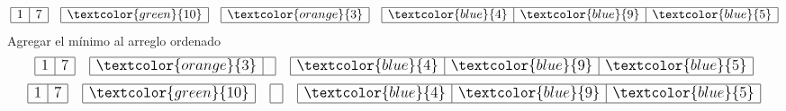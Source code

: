 \documentclass{article}
\begin{document}
\begin{minipage}{0.5\textwidth}
\begin{equation*}
\begin{array}{|r|r|}
      \hline 1 & 7\\ \hline
    \end{array} \quad
    \begin{array}{|r|}
      \hline \textcolor{green}{10} \\ \hline
    \end{array} \quad
    \begin{array}{|r|}
      \hline \textcolor{orange}{3} \\ \hline
    \end{array} \quad 
    \begin{array}{|r|r|r|}
      \hline \textcolor{blue}{4} & \textcolor{blue}{9} & \textcolor{blue}{5} \\ \hline
    \end{array}
  \end{equation*}
  Agregar el mínimo al arreglo ordenado
  \begin{equation*}
    \large
    \begin{array}{|r|r|}
      \hline 1 & 7\\ \hline
    \end{array} \quad
    \begin{array}{|r|r|}
      \hline \textcolor{orange}{3} & \\ \hline
    \end{array}\quad 
    \begin{array}{|r|r|r|}
      \hline \textcolor{blue}{4} & \textcolor{blue}{9} & \textcolor{blue}{5} \\ \hline
    \end{array}
  \end{equation*}
  \begin{equation*}
    \large
    \begin{array}{|r|r|}
      \hline 1 & 7\\ \hline
    \end{array} \quad
    \begin{array}{|r|}
      \hline \textcolor{green}{10} \\ \hline
    \end{array} \quad
    \begin{array}{|r|}
      \hline \\ \hline
    \end{array} \quad 
    \begin{array}{|r|r|r|}
      \hline \textcolor{blue}{4} & \textcolor{blue}{9} & \textcolor{blue}{5} \\ \hline
    \end{array}

\end{equation*}
\end{minipage}
\end{document}
